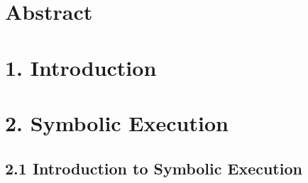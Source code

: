 \documentclass[]{article}
\date{}
\begin{document}
\hypertarget{header-n3}{%
\section{Abstract}\label{header-n3}}

\hypertarget{header-n5}{%
\section{1. Introduction}\label{header-n5}}

\hypertarget{header-n6}{%
\section{2. Symbolic Execution}\label{header-n6}}

\hypertarget{header-n7}{%
\subsection{2.1 Introduction to Symbolic Execution}\label{header-n7}}
\end{document}
